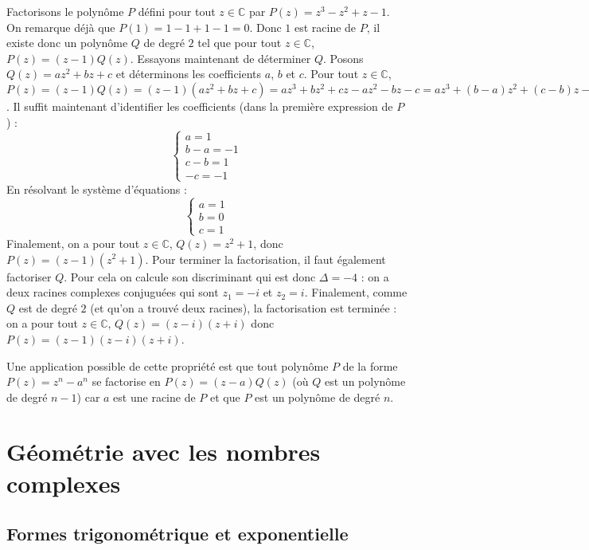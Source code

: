 	\begin{tip}[Exemple]
		Factorisons le polynôme $P$ défini pour tout $z \in \mathbb{C}$ par $P(z) = z^3 - z^2 + z - 1$.
		\newpar
		On remarque déjà que $P(1) = 1 - 1 + 1 - 1 = 0$. Donc $1$ est racine de $P$, il existe donc un polynôme $Q$ de degré $2$ tel que pour tout $z \in \mathbb{C}$, $P(z) = (z-1)Q(z)$.
		\newpar
		Essayons maintenant de déterminer $Q$. Posons $Q(z) = az^2 + bz + c$ et déterminons les coefficients $a$, $b$ et $c$.
		\newpar
		Pour tout $z \in \mathbb{C}$, $P(z) = (z-1)Q(z) = (z-1)(az^2 + bz + c) = az^3 + bz^2 + cz - az^2 - bz - c = az^3 + (b-a)z^2 + (c-b)z - c$.
		\newpar
		Il suffit maintenant d'identifier les coefficients (dans la première expression de $P$) :
		\[ \begin{cases} a = 1 \\ b-a = -1 \\ c-b = 1 \\ -c = -1 \end{cases} \]
		En résolvant le système d'équations :
		\[ \begin{cases} a = 1 \\ b = 0 \\ c = 1 \end{cases} \]
		Finalement, on a pour tout $z \in \mathbb{C}$, $Q(z) = z^2 + 1$, donc $P(z) = (z-1)(z^2 + 1)$.
		\newpar
		Pour terminer la factorisation, il faut également factoriser $Q$. Pour cela on calcule son discriminant qui est donc $\Delta = -4$ : on a deux racines complexes conjuguées qui sont $z_1 = -i$ et $z_2 = i$.
		\newpar
		Finalement, comme $Q$ est de degré $2$ (et qu'on a trouvé deux racines), la factorisation est terminée : on a pour tout $z \in \mathbb{C}$, $Q(z) = (z-i)(z+i)$ donc $P(z) = (z-1)(z-i)(z+i)$.
	\end{tip}

	Une application possible de cette propriété est que tout polynôme $P$ de la forme $P(z) = z^n - a^n$ se factorise en $P(z) = (z-a)Q(z)$ (où $Q$ est un polynôme de degré $n-1$) car $a$ est une racine de $P$ et que $P$ est un polynôme de degré $n$.

	\section{Géométrie avec les nombres complexes}

	\subsection{Formes trigonométrique et exponentielle}
	\label{forme-exponentielle}


